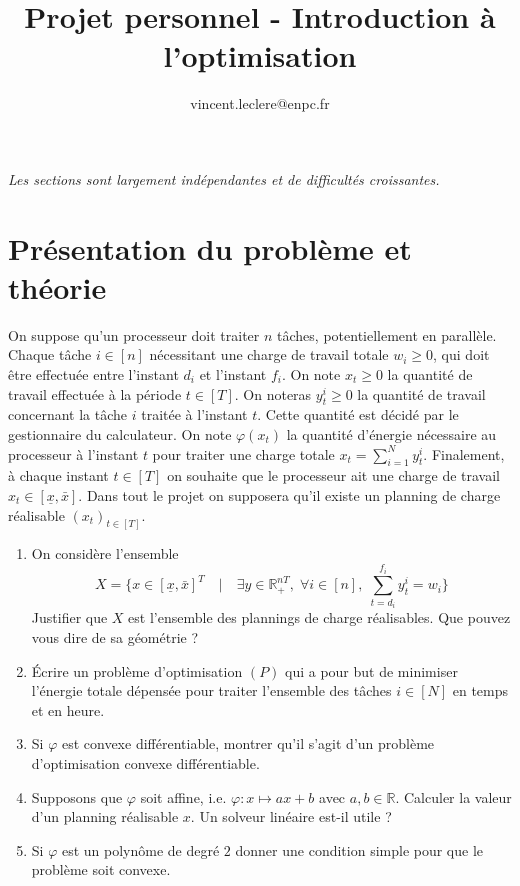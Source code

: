 \documentclass[10pt]{article}
\title{Projet personnel - Introduction à l'optimisation}
\author{vincent.leclere@enpc.fr}
\def\R{\mathbb{R}}
\begin{document}
\maketitle

{\em Les sections sont largement indépendantes et de difficultés croissantes. }

\section{Présentation du problème et théorie}

On suppose qu'un processeur doit traiter $n$ tâches, potentiellement en parallèle. Chaque tâche $i\in[n]$
nécessitant une charge de travail totale $w_i \geq 0$, qui doit être effectuée entre l'instant
$d_i$ et l'instant $f_i$. On note $x_t \geq 0$ la quantité de travail effectuée à la période
$t \in [T]$.
On noteras $y_t^i \geq 0$ la quantité de travail concernant
la tâche $i$ traitée à l'instant $t$. Cette quantité est décidé par le gestionnaire du calculateur.
On note $\varphi(x_t)$ la quantité d'énergie nécessaire au processeur à l'instant
$t$ pour traiter une charge totale $x_t = \sum_{i=1}^N y_t^i$.
Finalement, à chaque instant $t\in[T]$ on souhaite
que le processeur ait une charge de travail $x_t \in [\underline{x},\bar{x}]$.
Dans tout le projet on supposera qu'il existe un planning de charge réalisable $(x_t)_{t\in[T]}$.

\begin{enumerate}
 \item On considère l'ensemble
 $$X = \{x \in [\underline{x},\bar{x}]^T \quad | \quad \exists y \in \R_+^{nT}, \; \forall i\in[n],\; \sum_{t=d_i}^{f_i}y_t^i = w_i\}$$
 Justifier que $X$ est l'ensemble des plannings de charge réalisables. Que pouvez vous dire de sa géométrie ?
 \item \'Ecrire un problème d'optimisation $(P)$ qui a pour but de minimiser l'énergie totale dépensée pour traiter l'ensemble des tâches $i\in[N]$ en temps et en heure.
 \item Si $\varphi$ est convexe différentiable, montrer qu'il s'agit d'un problème d'optimisation convexe différentiable.
 \item Supposons que $\varphi$ soit affine, i.e. $\varphi : x  \mapsto ax + b $ avec $a,b\in\R$.
 Calculer la valeur d'un planning réalisable $x$. Un solveur linéaire est-il utile ?
 \item Si $\varphi$ est un polynôme de degré $2$ donner une condition simple pour que le problème soit convexe.
\end{enumerate}
\end{document}
